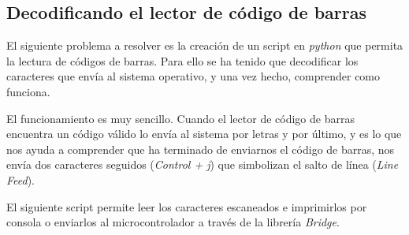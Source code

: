 \subsection{Decodificando el lector de código de barras}

El siguiente problema a resolver es la creación de un script en \emph{python} que permita la lectura de códigos de barras. Para ello se ha tenido que decodificar los caracteres que envía al sistema operativo, y una vez hecho, comprender como funciona.

El funcionamiento es muy sencillo. Cuando el lector de código de barras encuentra un código válido lo envía al sistema por letras y por último, y es lo que nos ayuda a comprender que ha terminado de enviarnos el código de barras, nos envía dos caracteres seguidos (\emph{Control + j}) que simbolizan el salto de línea (\emph{Line Feed}).

El siguiente script permite leer los caracteres escaneados e imprimirlos por consola o enviarlos al microcontrolador a través de la librería \emph{Bridge}.

